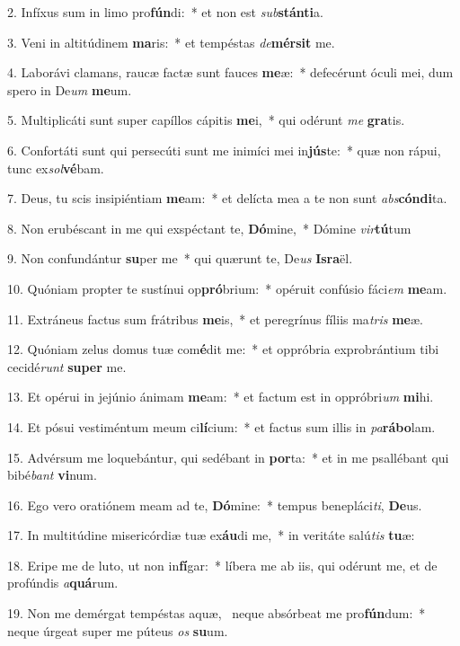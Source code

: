 2. Infíxus sum in limo pro\textbf{fún}di:~*  et non est \textit{sub}\textbf{stán}\textbf{ti}a.\

3. Veni in altitúdinem \textbf{ma}ris:~*  et tempéstas \textit{de}\textbf{mér}\textbf{sit} me.\

4. Laborávi clamans, raucæ factæ sunt fauces \textbf{me}æ:~*  defecérunt óculi mei, dum spero in De\textit{um} \textbf{me}um.\

5. Multiplicáti sunt super capíllos cápitis \textbf{me}i,~*  qui odérunt \textit{me} \textbf{gra}tis.\

6. Confortáti sunt qui persecúti sunt me inimíci mei in\textbf{jús}te:~*  quæ non rápui, tunc ex\textit{sol}\textbf{vé}bam.\

7. Deus, tu scis insipiéntiam \textbf{me}am:~*  et delícta mea a te non sunt \textit{abs}\textbf{cón}\textbf{di}ta.\

8. Non erubéscant in me qui exspéctant te, \textbf{Dó}mine,~*  Dómine \textit{vir}\textbf{tú}tum\

9. Non confundántur \textbf{su}per me~*  qui quærunt te, De\textit{us} \textbf{Is}\textbf{ra}ël.\

10. Quóniam propter te sustínui op\textbf{pró}brium:~*  opéruit confúsio fáci\textit{em} \textbf{me}am.\

11. Extráneus factus sum frátribus \textbf{me}is,~*  et peregrínus fíliis ma\textit{tris} \textbf{me}æ.\

12. Quóniam zelus domus tuæ com\textbf{é}dit me:~*  et oppróbria exprobrántium tibi cecidé\textit{runt} \textbf{su}\textbf{per} me.\

13. Et opérui in jejúnio ánimam \textbf{me}am:~*  et factum est in oppróbri\textit{um} \textbf{mi}hi.\

14. Et pósui vestiméntum meum ci\textbf{lí}cium:~*  et factus sum illis in \textit{pa}\textbf{rá}\textbf{bo}lam.\

15. Advérsum me loquebántur, qui sedébant in \textbf{por}ta:~*  et in me psallébant qui bibé\textit{bant} \textbf{vi}num.\

16. Ego vero oratiónem meam ad te, \textbf{Dó}mine:~*  tempus benepláci\textit{ti}, \textbf{De}us.\

17. In multitúdine misericórdiæ tuæ ex\textbf{áu}di me,~*  in veritáte salú\textit{tis} \textbf{tu}æ:\

18. Eripe me de luto, ut non in\textbf{fí}gar:~*  líbera me ab iis, qui odérunt me, et de profúndis \textit{a}\textbf{quá}rum.\

19. Non me demérgat tempéstas aquæ, \dag\  neque absórbeat me pro\textbf{fún}dum:~*  neque úrgeat super me púteus \textit{os} \textbf{su}um.\

